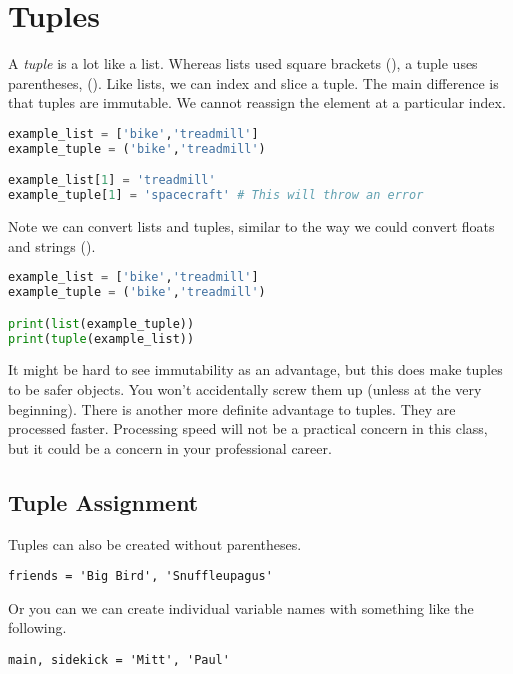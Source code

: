 \section{Tuples}

A \emph{tuple} is a lot like a list. Whereas lists used square brackets (\code{[]}), a tuple uses parentheses, (\code{()}). Like lists, we can index and slice a tuple. The main difference is that tuples are immutable. We cannot reassign the element at a particular index. 

\begin{lstlisting}[language = Python]
example_list = ['bike','treadmill']
example_tuple = ('bike','treadmill')

example_list[1] = 'treadmill'
example_tuple[1] = 'spacecraft' # This will throw an error\end{lstlisting}

Note we can convert lists and tuples, similar to the way we could convert floats and strings ().

\begin{lstlisting}[language = Python]
example_list = ['bike','treadmill']
example_tuple = ('bike','treadmill')

print(list(example_tuple))
print(tuple(example_list)) \end{lstlisting}


It might be hard to see immutability as an advantage, but this does make tuples to be safer objects. You won't accidentally screw them up (unless at the very beginning). There is another more definite advantage to tuples. They are processed faster. Processing speed will not be a practical concern in this class, but it could be a concern in your professional career. 


\subsection{Tuple Assignment}

Tuples can also be created without parentheses. 

\begin{lstlisting}
friends = 'Big Bird', 'Snuffleupagus'
\end{lstlisting}

Or you can we can create individual variable names with something like the following. 

\begin{lstlisting}
main, sidekick = 'Mitt', 'Paul'
\end{lstlisting}

